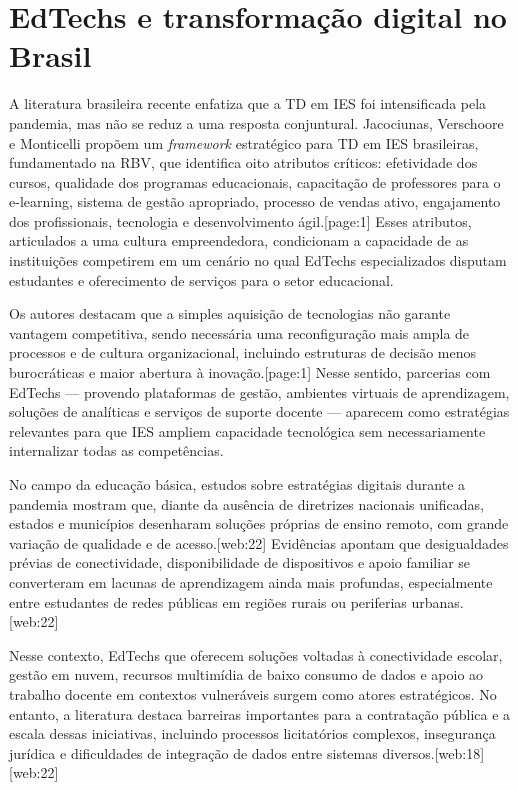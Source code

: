\documentclass[12pt]{article}
\begin{document}
\section{EdTechs e transforma\c{c}\~ao digital no Brasil}

A literatura brasileira recente enfatiza que a TD em IES foi intensificada pela pandemia, mas n\~ao se reduz a uma resposta conjuntural. Jacociunas, Verschoore e Monticelli prop\~oem um \emph{framework} estrat\'egico para TD em IES brasileiras, fundamentado na RBV, que identifica oito atributos cr\'iticos: efetividade dos cursos, qualidade dos programas educacionais, capacita\c{c}\~ao de professores para o e-learning, sistema de gest\~ao apropriado, processo de vendas ativo, engajamento dos profissionais, tecnologia e desenvolvimento \'agil.[page:1] Esses atributos, articulados a uma cultura empreendedora, condicionam a capacidade de as institui\c{c}\~oes competirem em um cen\'ario no qual EdTechs especializados disputam estudantes e oferecimento de servi\c{c}os para o setor educacional.

Os autores destacam que a simples aquisi\c{c}\~ao de tecnologias n\~ao garante vantagem competitiva, sendo necess\'aria uma reconfigura\c{c}\~ao mais ampla de processos e de cultura organizacional, incluindo estruturas de decis\~ao menos burocr\'aticas e maior abertura \`a inova\c{c}\~ao.[page:1] Nesse sentido, parcerias com EdTechs --- provendo plataformas de gest\~ao, ambientes virtuais de aprendizagem, solu\c{c}\~oes de anal\'iticas e servi\c{c}os de suporte docente --- aparecem como estrat\'egias relevantes para que IES ampliem capacidade tecnol\'ogica sem necessariamente internalizar todas as compet\^encias.

No campo da educa\c{c}\~ao b\'asica, estudos sobre estrat\'egias digitais durante a pandemia mostram que, diante da aus\^encia de diretrizes nacionais unificadas, estados e munic\'ipios desenharam solu\c{c}\~oes pr\'oprias de ensino remoto, com grande varia\c{c}\~ao de qualidade e de acesso.[web:22] Evid\^encias apontam que desigualdades pr\'evias de conectividade, disponibilidade de dispositivos e apoio familiar se converteram em lacunas de aprendizagem ainda mais profundas, especialmente entre estudantes de redes p\'ublicas em regi\~oes rurais ou periferias urbanas.[web:22]

Nesse contexto, EdTechs que oferecem solu\c{c}\~oes voltadas \`a conectividade escolar, gest\~ao em nuvem, recursos multim\'idia de baixo consumo de dados e apoio ao trabalho docente em contextos vulner\'aveis surgem como atores estrat\'egicos. No entanto, a literatura destaca barreiras importantes para a contrata\c{c}\~ao p\'ublica e a escala dessas iniciativas, incluindo processos licitat\'orios complexos, inseguran\c{c}a jur\'idica e dificuldades de integra\c{c}\~ao de dados entre sistemas diversos.[web:18][web:22]
\end{document}
